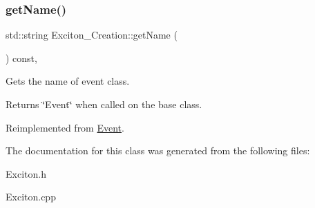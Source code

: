 \subsubsection{\texorpdfstring{get\+Name()}{getName()}}
{\footnotesize\ttfamily std\+::string Exciton\+\_\+\+Creation\+::get\+Name (\begin{DoxyParamCaption}{ }\end{DoxyParamCaption}) const\hspace{0.3cm}{\ttfamily [inline]}, {\ttfamily [virtual]}}



Gets the name of event class. 

\begin{DoxyReturn}{Returns}
\char`\"{}\+Event\char`\"{} when called on the base class. 
\end{DoxyReturn}


Reimplemented from \hyperlink{class_event_a8c38a406d844d05eac1ef007bad2487f}{Event}.



The documentation for this class was generated from the following files\+:\begin{DoxyCompactItemize}
\item 
Exciton.\+h\item 
Exciton.\+cpp\end{DoxyCompactItemize}

